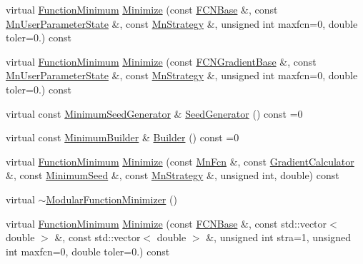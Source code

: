 \begin{DoxyCompactItemize}
\item 
virtual \mbox{\hyperlink{classROOT_1_1Minuit2_1_1FunctionMinimum}{Function\+Minimum}} \mbox{\hyperlink{classROOT_1_1Minuit2_1_1ModularFunctionMinimizer_ad001dbb0a2d17022eb0818b4eddc2af9}{Minimize}} (const \mbox{\hyperlink{classROOT_1_1Minuit2_1_1FCNBase}{F\+C\+N\+Base}} \&, const \mbox{\hyperlink{classROOT_1_1Minuit2_1_1MnUserParameterState}{Mn\+User\+Parameter\+State}} \&, const \mbox{\hyperlink{classROOT_1_1Minuit2_1_1MnStrategy}{Mn\+Strategy}} \&, unsigned int maxfcn=0, double toler=0.) const
\item 
virtual \mbox{\hyperlink{classROOT_1_1Minuit2_1_1FunctionMinimum}{Function\+Minimum}} \mbox{\hyperlink{classROOT_1_1Minuit2_1_1ModularFunctionMinimizer_a695166fd33368026170d6e2224cb2b7a}{Minimize}} (const \mbox{\hyperlink{classROOT_1_1Minuit2_1_1FCNGradientBase}{F\+C\+N\+Gradient\+Base}} \&, const \mbox{\hyperlink{classROOT_1_1Minuit2_1_1MnUserParameterState}{Mn\+User\+Parameter\+State}} \&, const \mbox{\hyperlink{classROOT_1_1Minuit2_1_1MnStrategy}{Mn\+Strategy}} \&, unsigned int maxfcn=0, double toler=0.) const
\item 
virtual const \mbox{\hyperlink{classROOT_1_1Minuit2_1_1MinimumSeedGenerator}{Minimum\+Seed\+Generator}} \& \mbox{\hyperlink{classROOT_1_1Minuit2_1_1ModularFunctionMinimizer_a742930de97b0ce9ba23773874ae0894b}{Seed\+Generator}} () const =0
\item 
virtual const \mbox{\hyperlink{classROOT_1_1Minuit2_1_1MinimumBuilder}{Minimum\+Builder}} \& \mbox{\hyperlink{classROOT_1_1Minuit2_1_1ModularFunctionMinimizer_a13e98551cf14e927c61e1e34ecf8ba8b}{Builder}} () const =0
\item 
virtual \mbox{\hyperlink{classROOT_1_1Minuit2_1_1FunctionMinimum}{Function\+Minimum}} \mbox{\hyperlink{classROOT_1_1Minuit2_1_1ModularFunctionMinimizer_ad4852ac93fa43f2328b9857acc602296}{Minimize}} (const \mbox{\hyperlink{classROOT_1_1Minuit2_1_1MnFcn}{Mn\+Fcn}} \&, const \mbox{\hyperlink{classROOT_1_1Minuit2_1_1GradientCalculator}{Gradient\+Calculator}} \&, const \mbox{\hyperlink{classROOT_1_1Minuit2_1_1MinimumSeed}{Minimum\+Seed}} \&, const \mbox{\hyperlink{classROOT_1_1Minuit2_1_1MnStrategy}{Mn\+Strategy}} \&, unsigned int, double) const
\item 
virtual \mbox{\hyperlink{classROOT_1_1Minuit2_1_1ModularFunctionMinimizer_ae8442b0de1a033c86c7b5167f66e0eed}{$\sim$\+Modular\+Function\+Minimizer}} ()
\item 
virtual \mbox{\hyperlink{classROOT_1_1Minuit2_1_1FunctionMinimum}{Function\+Minimum}} \mbox{\hyperlink{classROOT_1_1Minuit2_1_1ModularFunctionMinimizer_a0a881c0e1c53c2144c437cfb18f1971e}{Minimize}} (const \mbox{\hyperlink{classROOT_1_1Minuit2_1_1FCNBase}{F\+C\+N\+Base}} \&, const std\+::vector$<$ double $>$ \&, const std\+::vector$<$ double $>$ \&, unsigned int stra=1, unsigned int maxfcn=0, double toler=0.) const

\end{DoxyCompactItemize}
